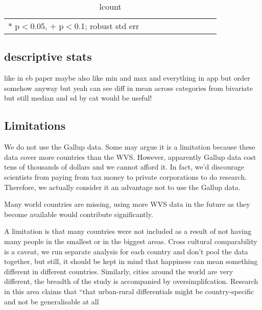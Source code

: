 \documentclass[10pt, letterpaper]{article}
\begin{document}
\begin{spacing}{.9} \begin{table}[H]\centering \caption{.} \label{d1} \begin{scriptsize} \begin{tabular}{llllllllll}\hline  \hline   * p$<$0.05, $+$ p$<$0.1; robust std err \end{tabular}\end{scriptsize}\caption{lcount}\end{table} \end{spacing}


\begin{spacing}{1.4} %


\section{descriptive stats}

like in eb paper maybe also like min and max and everything
in app but order somehow anyway but yeah can see diff in mean across categories
from bivariate but still median and sd by cat would be useful!


\subsection{Limitations}

We do not use the Gallup data. Some may argue it is a limitation because these data
cover more countries than the WVS. However, apparently Gallup data cost tens of
thousands of dollars and we cannot afford it. In fact, we'd discourage scientists
from paying from tax money to private corporations to do research. Therefore, we
actually consider it an advantage not to use the Gallup data.

Many world countries are missing, using more WVS data in the future as they
become available would contribute significantly. 

A limitation is that many countries were not included as a result of not having many
people in the smallest or in the biggest areas.  Cross cultural comparability is a caveat, we run separate analysis for each country and don't pool the data together, but still, it should be kept in mind that happiness can mean something different in different countries. Similarly, cities around the world are very different, the breadth of the study is accompanied by oversimplifcation. Research in this area claims that ``that urban-rural differentials might be country-specific and not be generalisable at all %


\end{spacing}
\end{document}

